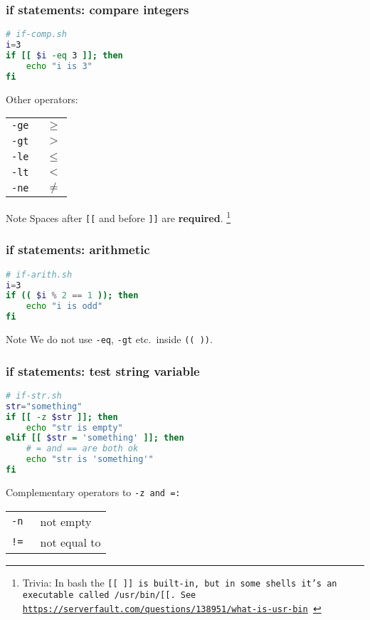 \begin{frame}[fragile]
\frametitle{\textbf{if} statements: compare integers}
\begin{lstlisting}[language=bash]
# if-comp.sh
i=3
if [[ $i -eq 3 ]]; then
    echo "i is 3"
fi
\end{lstlisting}
Other operators:
\begin{table}
    \centering
    \begin{tabular}{ll}
        \tt{-ge} & $\geq$ \\
        \tt{-gt} & $>$    \\
        \tt{-le} & $\leq$ \\
        \tt{-lt} & $<$    \\
        \tt{-ne} & $\neq$
    \end{tabular}
\end{table}
\begin{block}{Note}
    Spaces after \verb|[[| and before \verb|]]| are \textbf{required}.
    \footnote{
        Trivia: In bash the \tt{[[ ]]} is built-in, but in some shells
        it's an executable called \tt{/usr/bin/[[}.
        See \url{https://serverfault.com/questions/138951/what-is-usr-bin}
    }
\end{block}
\end{frame}

\begin{frame}[fragile]
\frametitle{\textbf{if} statements: arithmetic}
\begin{lstlisting}[language=bash]
# if-arith.sh
i=3
if (( $i % 2 == 1 )); then
    echo "i is odd"
fi
\end{lstlisting}
\begin{block}{Note}
    We do not use \verb|-eq|, \verb|-gt| etc.~inside \verb|(( ))|.
\end{block}
\end{frame}

\begin{frame}[fragile]
\frametitle{\textbf{if} statements: test string variable}
\begin{lstlisting}[language=bash]
# if-str.sh
str="something"
if [[ -z $str ]]; then
    echo "str is empty"
elif [[ $str = 'something' ]]; then
    # = and == are both ok
    echo "str is 'something'"
fi
\end{lstlisting}
Complementary operators to \tt{-z} and \tt{=}:
\begin{table}
    \centering
    \begin{tabular}{ll}
        \tt{-n} & not empty \\
        \tt{!=} & not equal to
    \end{tabular}
\end{table}
\end{frame}

